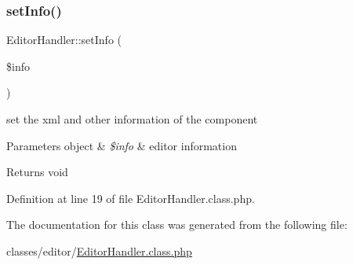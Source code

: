\subsubsection{\texorpdfstring{set\+Info()}{setInfo()}}
{\footnotesize\ttfamily Editor\+Handler\+::set\+Info (\begin{DoxyParamCaption}\item[{}]{\$info }\end{DoxyParamCaption})}

set the xml and other information of the component 
\begin{DoxyParams}[1]{Parameters}
object & {\em \$info} & editor information \\
\hline
\end{DoxyParams}
\begin{DoxyReturn}{Returns}
void 
\end{DoxyReturn}


Definition at line 19 of file Editor\+Handler.\+class.\+php.



The documentation for this class was generated from the following file\+:\begin{DoxyCompactItemize}
\item 
classes/editor/\hyperlink{EditorHandler_8class_8php}{Editor\+Handler.\+class.\+php}\end{DoxyCompactItemize}
